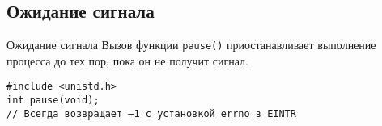 \documentclass{beamer}
\begin{document}
\subsection{Ожидание сигнала}

\begin{frame}[fragile]{Ожидание сигнала}
    Вызов функции \texttt{pause()} приостанавливает выполнение процесса до тех пор, пока он не получит сигнал.
\begin{verbatim}
#include <unistd.h>
int pause(void);
// Всегда возвращает –1 с установкой errno в EINTR
\end{verbatim}
\end{frame}
\end{document}
